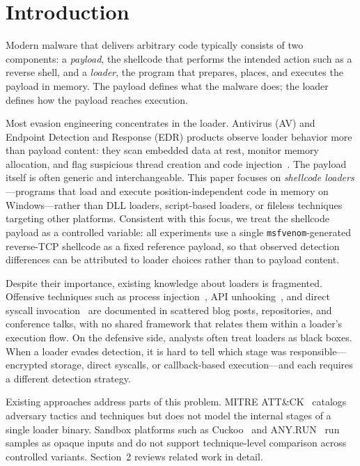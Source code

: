 \section{Introduction}

Modern malware that delivers arbitrary code typically consists of two components: a \textit{payload}, the shellcode that performs the intended action such as a reverse shell, and a \textit{loader}, the program that prepares, places, and executes the payload in memory.
The payload defines what the malware does; the loader defines how the payload reaches execution.

Most evasion engineering concentrates in the loader.
Antivirus (AV) and Endpoint Detection and Response (EDR) products observe loader behavior more than payload content: they scan embedded data at rest, monitor memory allocation, and flag suspicious thread creation and code injection~\cite{mitre_execution}.
The payload itself is often generic and interchangeable.
This paper focuses on \textit{shellcode loaders}---programs that load and execute position-independent code in memory on Windows---rather than DLL loaders, script-based loaders, or fileless techniques targeting other platforms.
Consistent with this focus, we treat the shellcode payload as a controlled variable: all experiments use a single \texttt{msfvenom}-generated reverse-TCP shellcode as a fixed reference payload, so that observed detection differences can be attributed to loader choices rather than to payload content.

Despite their importance, existing knowledge about loaders is fragmented.
Offensive techniques such as process injection~\cite{process_injection}, API unhooking~\cite{api_unhooking}, and direct syscall invocation~\cite{hellsgate} are documented in scattered blog posts, repositories, and conference talks, with no shared framework that relates them within a loader's execution flow.
On the defensive side, analysts often treat loaders as black boxes.
When a loader evades detection, it is hard to tell which stage was responsible---encrypted storage, direct syscalls, or callback-based execution---and each requires a different detection strategy.

Existing approaches address parts of this problem.
MITRE ATT\&CK~\cite{mitre_attack} catalogs adversary tactics and techniques but does not model the internal stages of a single loader binary.
Sandbox platforms such as Cuckoo~\cite{cuckoo} and ANY.RUN~\cite{anyrun} run samples as opaque inputs and do not support technique-level comparison across controlled variants.
Section~2 reviews related work in detail.


